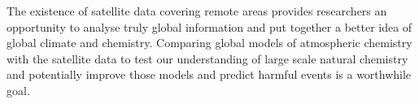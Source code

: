 The existence of satellite data covering remote areas provides researchers an opportunity to analyse truly global information and put together a better idea of global climate and chemistry.
Comparing global models of atmospheric chemistry with the satellite data to test our understanding of large scale natural chemistry and potentially improve those models and predict harmful events is a worthwhile goal.